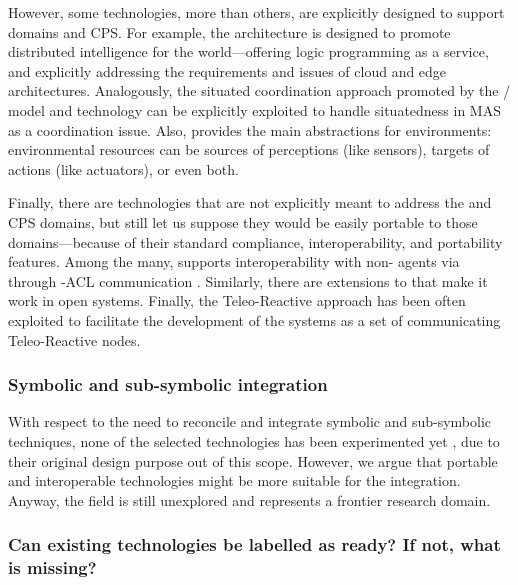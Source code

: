 \documentclass[12pt,a4paper,openright,twoside]{book}
\begin{document}
However, some technologies, more than others, are explicitly designed to support \iot{} domains and CPS.
%
For example, the \lpaas{} architecture \cite{lpaas-tplp18} is designed to promote distributed intelligence for the \iot{} world---offering logic programming as a service, and explicitly addressing the requirements and issues of cloud and edge architectures.
%
Analogously, the situated coordination approach promoted by the \tucson{}/\respect{} model and technology can be explicitly exploited to handle situatedness in MAS as a coordination issue.
%
Also, \tucson{} \cite{tucson-jaamas2} provides the main abstractions for \iot{} environments: environmental resources can be sources of perceptions (like sensors), targets of actions (like actuators), or even both.

Finally, there are technologies that are not explicitly meant to address the \iot{} and CPS domains, but still let us suppose they would be easily portable to those domains---because of their standard compliance, interoperability, and portability features.
%
Among the many, \jason{} \cite{jason-clima2005} supports interoperability with non-\jason{} agents via \jade{} \cite{jade-mapbook2005} through \fipa{}-ACL communication \cite{fipa-acl}.
%
Similarly, there are extensions to \jack{} \cite{jack-mapbook2005} that make it work in open systems.
%
Finally, the Teleo-Reactive \cite{nilsson2001-teleoreactive} approach has been often exploited to facilitate the development of the \iot{} systems as a set of communicating Teleo-Reactive nodes.

\subsubsection{Symbolic and sub-symbolic integration}

With respect to the need to reconcile and integrate symbolic and sub-symbolic techniques, none of the selected technologies has been experimented yet \cite{xaisurvey-ia14}, due to their original design purpose out of this scope.
%
However, we argue that portable and interoperable technologies might be more suitable for the integration.
%
Anyway, the field is still unexplored and represents a frontier research domain.

\subsubsection{Can existing technologies be labelled as ready? If not, what is missing?}
\end{document}
